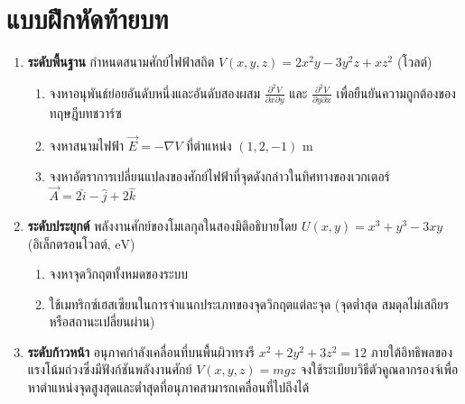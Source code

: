 \section{แบบฝึกหัดท้ายบท}
\begin{enumerate}
    \item \textbf{ระดับพื้นฐาน} กำหนดสนามศักย์ไฟฟ้าสถิต $V(x, y, z) = 2x^2 y - 3y^2 z + x z^2$ (โวลต์)
    \begin{enumerate}
        \item จงหาอนุพันธ์ย่อยอันดับหนึ่งและอันดับสองผสม $\frac{\partial^2 V}{\partial x \partial y}$ และ $\frac{\partial^2 V}{\partial y \partial x}$ เพื่อยืนยันความถูกต้องของทฤษฎีบทชวาร์ซ
        \item จงหาสนามไฟฟ้า $\vec{E} = -\nabla V$ ที่ตำแหน่ง $(1, 2, -1)\text{ m}$
        \item จงหาอัตราการเปลี่ยนแปลงของศักย์ไฟฟ้าที่จุดดังกล่าวในทิศทางของเวกเตอร์ $\vec{A} = 2\hat{i} - \hat{j} + 2\hat{k}$
    \end{enumerate}
    
    \item \textbf{ระดับประยุกต์} พลังงานศักย์ของโมเลกุลในสองมิติอธิบายโดย $U(x, y) = x^3 + y^3 - 3xy$ (อิเล็กตรอนโวลต์, $\text{eV}$)
    \begin{enumerate}
        \item จงหาจุดวิกฤตทั้งหมดของระบบ
        \item ใช้เมทริกซ์เฮสเซียนในการจำแนกประเภทของจุดวิกฤตแต่ละจุด (จุดต่ำสุด สมดุลไม่เสถียร หรือสถานะเปลี่ยนผ่าน)
    \end{enumerate}

    \item \textbf{ระดับก้าวหน้า} อนุภาคกำลังเคลื่อนที่บนพื้นผิวทรงรี $x^2 + 2y^2 + 3z^2 = 12$ ภายใต้อิทธิพลของแรงโน้มถ่วงซึ่งมีฟังก์ชันพลังงานศักย์ $V(x, y, z) = mgz$ จงใช้ระเบียบวิธีตัวคูณลากรองจ์เพื่อหาตำแหน่งจุดสูงสุดและต่ำสุดที่อนุภาคสามารถเคลื่อนที่ไปถึงได้
\end{enumerate}
